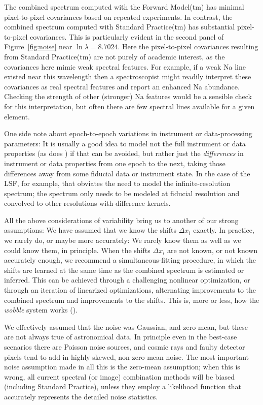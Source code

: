 \documentclass[modern]{aastex631}
\begin{document}
The combined spectrum computed with the Forward Model(tm) has minimal pixel-to-pixel covariances based on repeated experiments.
In contrast, the combined spectrum computed with Standard Practice(tm) has substantial pixel-to-pixel covariances.
This is particularly evident in the second panel of Figure~\ref{fig:noise} near $\ln\lambda = 8.7024$.
Here the pixel-to-pixel covariances resulting from Standard Practice(tm) are not purely of academic interest, as the covariances here mimic weak spectral features.
For example, if a weak Na line existed near this wavelength then a spectroscopist might readily interpret these covariances as real spectral features and report an enhanced Na abundance.
Checking the strength of other (stronger) Na features would be a sensible check for this interpretation, but often there are few spectral lines available for a given element.

One side note about epoch-to-epoch variations in instrument or data-processing parameters:
It is usually a good idea to model not the full instrument or data properties (as does \citealt{sp}) if that can be avoided, but rather just the \emph{differences} in instrument or data properties from one epoch to the next, taking those differences away from some fiducial data or instrument state.
In the case of the LSF, for example, that obviates the need to model the infinite-resolution spectrum; the spectrum only needs to be modeled at fiducial resolution and convolved to other resolutions with difference kernels.

All the above considerations of variability bring us to another of our strong assumptions:
We have assumed that we know the shifts $\Delta x_i$ exactly.
In practice, we rarely do, or maybe more accurately: We rarely know them as well as we could know them, in principle.
When the shifts $\Delta x_i$ are not known, or not known accurately enough, we recommend a simultaneous-fitting procedure, in which the shifts are learned at the same time as the combined spectrum is estimated or inferred.
This can be achieved through a challenging nonlinear optimization, or through an iteration of linearized optimizations, alternating improvements to the combined spectrum and improvements to the shifts.
This is, more or less, how the \textsl{wobble} system works (\citealt{wobble}).

We effectively assumed that the noise was Gaussian, and zero mean, but these are not always true of astronomical data.
In principle even in the best-case scenarios there are Poisson noise sources, and cosmic rays and faulty detector pixels tend to add in highly skewed, non-zero-mean noise.
The most important noise assumption made in all this is the zero-mean assumption; when this is wrong, all current spectral (or image) combination methods will be biased (including Standard Practice), unless they employ a likelihood function that accurately represents the detailed noise statistics.
\end{document}
